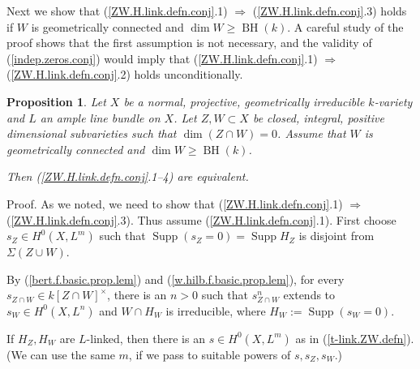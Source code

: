 \documentclass{amsart}
\newtheorem{prop}[thm]{Proposition}
\theoremstyle{definition}
\theoremstyle{remark}
\renewcommand{\o}[0]{{\mathcal O}}
\newcommand{\supp}[0]{\operatorname{Supp}}
\newcommand{\BH}[0]{\operatorname{BH}}
\begin{document}
Next we show that (\ref{ZW.H.link.defn.conj}.1) $\Rightarrow$ (\ref{ZW.H.link.defn.conj}.3) holds if $W$ is geometrically connected and  $\dim W\geq \BH(k)$. A careful study of the proof shows that the first assumption is not necessary, and the validity of (\ref{indep.zeros.conj})  would imply 
that (\ref{ZW.H.link.defn.conj}.1) $\Rightarrow$ (\ref{ZW.H.link.defn.conj}.2) holds unconditionally. 


\begin{prop} \label{ZW.H.link.prop.cor.v1}
Let $X$ be a  normal, projective, geometrically irreducible  $k$-variety and
$L$  an ample line bundle  on $X$.
Let $Z, W\subset X$ be closed, integral, positive dimensional  subvarieties
such that $\dim (Z\cap W)=0$.   
Assume that   $W$ is geometrically connected and  $\dim W\geq \BH(k)$.

Then   (\ref{ZW.H.link.defn.conj}.1--4) are equivalent. \end{prop}





Proof.  As we noted, we need to show that (\ref{ZW.H.link.defn.conj}.1) $\Rightarrow$ (\ref{ZW.H.link.defn.conj}.3).
Thus assume (\ref{ZW.H.link.defn.conj}.1). 
First choose   $s_Z\in H^0(X, L^m)$ such that
$\supp(s_Z=0)=\supp H_Z$ is  disjoint from $\Sigma(Z\cup W)$.

By (\ref{bert.f.basic.prop.lem}) and (\ref{w.hilb.f.basic.prop.lem}), for every  $s_{Z\cap W}\in k[Z\cap W]^\times$,  
there is an $n>0$ such that 
 $ s_{Z\cap W}^n$ extends to 
 $s_W\in H^0(X, L^n)$ and 
 $W\cap H_W$ is irreducible, where  $H_W:=\supp(s_W=0)$. 

If $H_Z, H_W$ are $L$-linked, then there is an
$s\in H^0(X, L^m)$ as in (\ref{t-link.ZW.defn}). 
(We can use the same $m$, if we pass to  suitable powers of $s,s_Z, s_W$.)




\end{document}
